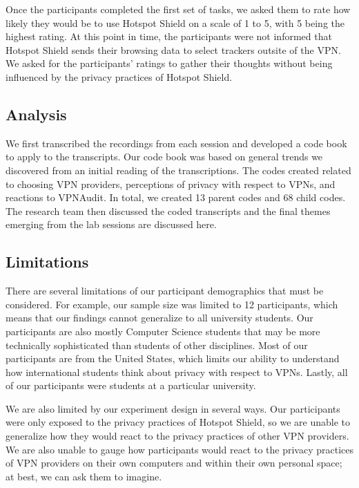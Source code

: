 Once the participants completed the first set of tasks, we asked them to rate how likely they would be to use Hotspot Shield on a scale of 1 to 5, with 5 being the highest rating.
At this point in time, the participants were not informed that Hotspot Shield sends their browsing data to select trackers outsite of the VPN.
We asked for the participants' ratings to gather their thoughts without being influenced by the privacy practices of Hotspot Shield.


\subsection{Analysis}
We first transcribed the recordings from each session and developed a code book to apply to the transcripts.
Our code book was based on general trends we discovered from an initial reading of the transcriptions.
The codes created related to choosing VPN providers, perceptions of privacy with respect to VPNs, and reactions to VPNAudit.
In total, we created 13 parent codes and 68 child codes.  The research team then discussed the coded transcripts and the final themes emerging from the lab sessions are discussed here.

\subsection{Limitations}
There are several limitations of our participant demographics that must be considered.
For example, our sample size was limited to 12 participants, which means that our findings cannot generalize to all university students.
Our participants are also mostly Computer Science students that may be more technically sophisticated than students of other disciplines.
Most of our participants are from the United States, which limits our ability to understand how international students think about privacy with respect to VPNs.
Lastly, all of our participants were students at a particular university.

We are also limited by our experiment design in several ways.
Our participants were only exposed to the privacy practices of Hotspot Shield, so we are unable to generalize how they would react to the privacy practices of other VPN providers.
We are also unable to gauge how participants would react to the privacy practices of VPN providers on their own computers and within their own personal space; at best, we can ask them to imagine.